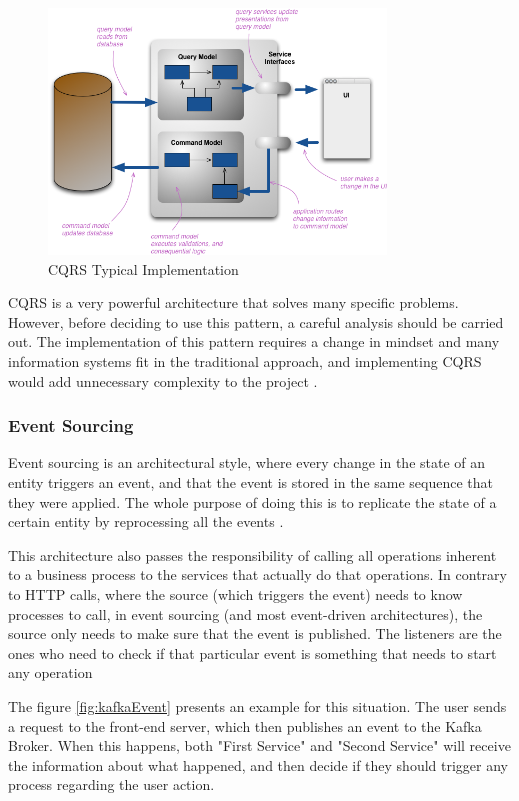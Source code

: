 \begin{figure}[t]
\centering
\includegraphics[width=0.8\textwidth,keepaspectratio]{chapters/State_of_the_Art/assets/cqrs.png}
\caption[CQRS Typical Implementation]{CQRS Typical Implementation\footnotemark}
\label{fig:cqrsExample}
\end{figure}
\par

\gls{CQRS} is a very powerful architecture that solves many specific problems. However, before deciding to use this pattern, a careful analysis should be carried out. The implementation of this pattern requires a change in mindset and many information systems fit in the traditional approach, and implementing \gls{CQRS} would add unnecessary complexity to the project \parencite{cqrs}.

\subsubsection{Event Sourcing}
\label{sub:StateOfTheArt_Architecture_EventSourcing}
Event sourcing is an architectural style, where every change in the state of an entity triggers an event, and that the event is stored in the same sequence that they were applied. The whole purpose of doing this is to replicate the state of a certain entity by reprocessing all the events \parencite{martinFowlerEventSourcing}.

\par
This architecture also passes the responsibility of calling all operations inherent to a business process to the services that actually do that operations. In contrary to \gls{HTTP} calls, where the source (which triggers the event) needs to know processes to call, in event sourcing (and most event-driven architectures), the source only needs to make sure that the event is published. The listeners are the ones who need to check if that particular event is something that needs to start any operation
\par
The figure \ref{fig:kafkaEvent} presents an example for this situation. The user sends a request to the front-end server, which then publishes an event to the Kafka Broker. When this happens, both "First Service" and "Second Service" will receive the information about what happened, and then decide if they should trigger any process regarding the user action.

